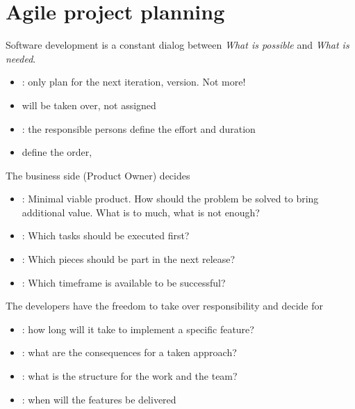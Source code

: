 \newpage
\section{Agile project planning}
Software development is a constant dialog between \emph{What is possible} and
\emph{What is needed}.
%
\begin{itemize}
\item {}: only plan for the next
  iteration, version. Not more!
\item {} will be taken over, not assigned
\item {}: the responsible persons define the effort and duration
\item {} define the order,
\end{itemize}

\newslide
The business side (Product Owner) decides
\begin{itemize}
\item {}: Minimal viable product. How should the problem be solved to
bring additional value. What is to much, what is not enough?
\item {}: Which tasks should be executed first?
\item {}: Which pieces should be part in the next release?
\item {}: Which timeframe is available to be successful?
\end{itemize}

\newslide
The developers have the freedom to take over responsibility and decide for
\begin{itemize}
\item {}: how long will it take to implement a specific feature?
\item {}: what are the consequences for a taken approach?
\item {}: what is the structure for the work and the team?
\item {}: when will the features be delivered
\end{itemize}

%
\newpage
